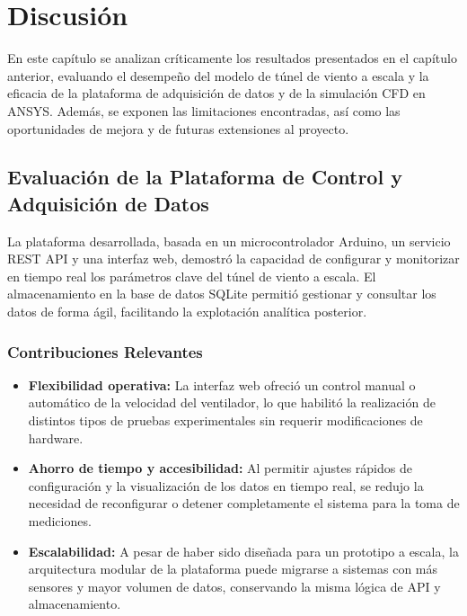 \chapter{Discusión}

En este capítulo se analizan críticamente los resultados presentados en el capítulo anterior, evaluando el desempeño del modelo de túnel de viento a escala y la eficacia de la plataforma de adquisición de datos y de la simulación CFD en ANSYS. Además, se exponen las limitaciones encontradas, así como las oportunidades de mejora y de futuras extensiones al proyecto.

\section{Evaluación de la Plataforma de Control y Adquisición de Datos}
La plataforma desarrollada, basada en un microcontrolador Arduino, un servicio REST API y una interfaz web, demostró la capacidad de configurar y monitorizar en tiempo real los parámetros clave del túnel de viento a escala. El almacenamiento en la base de datos SQLite permitió gestionar y consultar los datos de forma ágil, facilitando la explotación analítica posterior.

\subsection{Contribuciones Relevantes}
\begin{itemize}
    \item \textbf{Flexibilidad operativa:} La interfaz web ofreció un control manual o automático de la velocidad del ventilador, lo que habilitó la realización de distintos tipos de pruebas experimentales sin requerir modificaciones de hardware.
    \item \textbf{Ahorro de tiempo y accesibilidad:} Al permitir ajustes rápidos de configuración y la visualización de los datos en tiempo real, se redujo la necesidad de reconfigurar o detener completamente el sistema para la toma de mediciones.
    \item \textbf{Escalabilidad:} A pesar de haber sido diseñada para un prototipo a escala, la arquitectura modular de la plataforma puede migrarse a sistemas con más sensores y mayor volumen de datos, conservando la misma lógica de API y almacenamiento.
\end{itemize}

